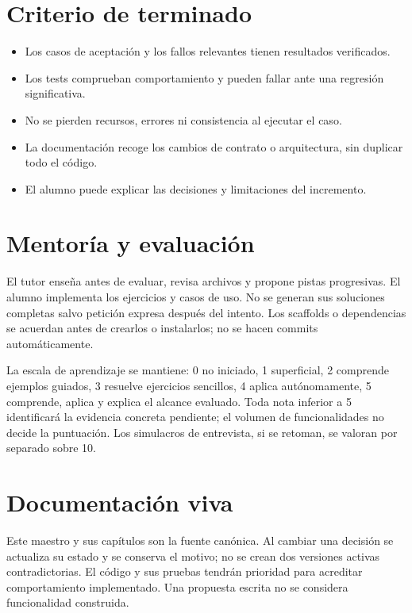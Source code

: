 \section{Criterio de terminado}
\begin{itemize}
\item Los casos de aceptación y los fallos relevantes tienen resultados verificados.
\item Los tests comprueban comportamiento y pueden fallar ante una regresión significativa.
\item No se pierden recursos, errores ni consistencia al ejecutar el caso.
\item La documentación recoge los cambios de contrato o arquitectura, sin duplicar todo el código.
\item El alumno puede explicar las decisiones y limitaciones del incremento.
\end{itemize}

\section{Mentoría y evaluación}
El tutor enseña antes de evaluar, revisa archivos y propone pistas progresivas. El alumno implementa los ejercicios y casos de uso. No se generan sus soluciones completas salvo petición expresa después del intento. Los scaffolds o dependencias se acuerdan antes de crearlos o instalarlos; no se hacen commits automáticamente.

La escala de aprendizaje se mantiene: 0 no iniciado, 1 superficial, 2 comprende ejemplos guiados, 3 resuelve ejercicios sencillos, 4 aplica autónomamente, 5 comprende, aplica y explica el alcance evaluado. Toda nota inferior a 5 identificará la evidencia concreta pendiente; el volumen de funcionalidades no decide la puntuación. Los simulacros de entrevista, si se retoman, se valoran por separado sobre 10.

\section{Documentación viva}
Este maestro y sus capítulos son la fuente canónica. Al cambiar una decisión se actualiza su estado y se conserva el motivo; no se crean dos versiones activas contradictorias. El código y sus pruebas tendrán prioridad para acreditar comportamiento implementado. Una propuesta escrita no se considera funcionalidad construida.

